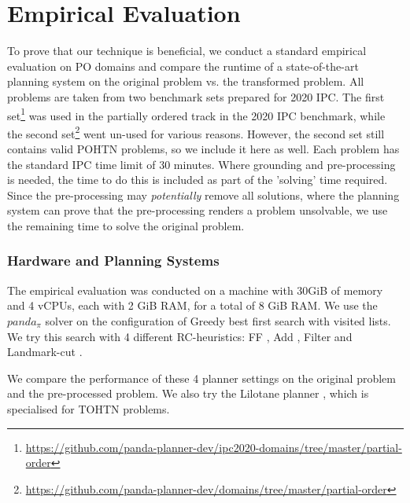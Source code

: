 \documentclass[runningheads]{llncs}
\begin{document}
\section{Empirical Evaluation}
To prove that our technique is beneficial, we conduct a standard empirical evaluation on PO domains and compare the runtime of a state-of-the-art planning system on the original problem vs. the transformed problem. All problems are taken from two benchmark sets prepared for 2020 IPC. The first set\footnote{\url{https://github.com/panda-planner-dev/ipc2020-domains/tree/master/partial-order}} was used in the partially ordered track in the 2020 IPC benchmark, while the second set\footnote{\url{https://github.com/panda-planner-dev/domains/tree/master/partial-order}} went un-used for various reasons. However, the second set still contains valid POHTN problems, so we include it here as well. Each problem has the standard IPC time limit of 30 minutes. Where grounding and pre-processing is needed, the time to do this is included as part of the 'solving' time required. Since the pre-processing may \emph{potentially} remove all solutions, where the planning system can prove that the pre-processing renders a problem unsolvable, we use the remaining time to solve the original problem.


\subsubsection{Hardware and Planning Systems}
The empirical evaluation was conducted on a machine with 30GiB of memory and 4 vCPUs, each with 2 GiB RAM, for a total of 8 GiB RAM.  We use the $panda_{\pi}$ solver \cite{progressionsearchJAIR20} \cite{useClassicalHeuristicIJCAI19} \cite{useClassicalHuristicICAPS18} on the configuration of Greedy best first search with  visited lists. We try this search with 4 different RC-heuristics: FF \cite{FF}, Add \cite{Add}, Filter \cite{useClassicalHuristicICAPS18} and Landmark-cut \cite{LM-Cut}.

We compare the performance of these 4 planner settings on the original problem and the pre-processed problem.
We also try the Lilotane planner \cite{Lilotane}, which is specialised for TOHTN problems. 
  
\end{document}
